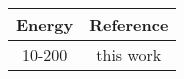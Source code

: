 \centering
\begin{tabular}{c c}
    \toprule
    \bf{Energy} & \bf{Reference} \\
    \midrule
    10-200 & this work \\
    \bottomrule
\end{tabular}
